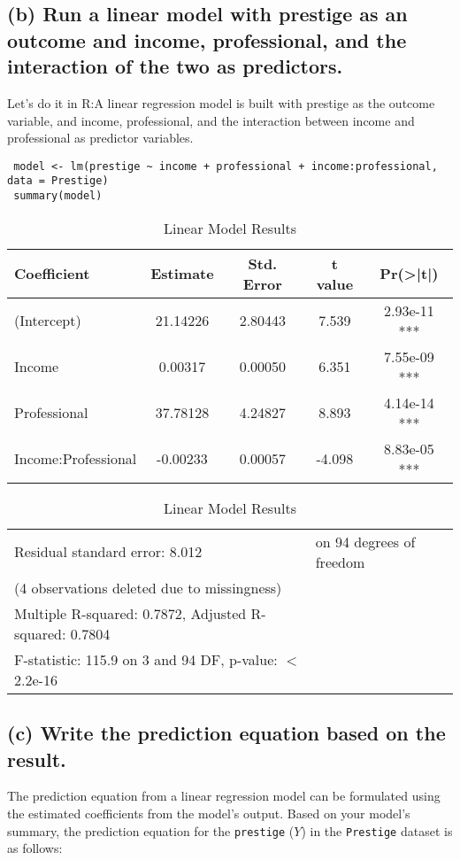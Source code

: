 \documentclass[12pt]{article}
\begin{document}
\subsection{(b) Run a linear model with prestige as an outcome and income, professional, and the
interaction of the two as predictors.}
 Let's do it in R:A linear regression model is built with prestige as the outcome variable, and income, professional, and the interaction between income and professional as predictor variables.
\lstset{style=mystyle}
\begin{lstlisting}
 model <- lm(prestige ~ income + professional + income:professional, data = Prestige)
 summary(model)
\end{lstlisting}
\begin{table}[h]
\centering
\caption{Linear Model Results}
\begin{tabular}{@{}lcccc@{}}
\toprule
Coefficient            & Estimate   & Std. Error & t value & Pr(\textgreater{}|t|) \\ \midrule
(Intercept)            & 21.14226   & 2.80443    & 7.539   & 2.93e-11 ***    \\
Income                 & 0.00317    & 0.00050    & 6.351   & 7.55e-09 ***    \\
Professional           & 37.78128   & 4.24827    & 8.893   & 4.14e-14 ***    \\
Income:Professional    & -0.00233   & 0.00057    & -4.098  & 8.83e-05 ***    \\ \bottomrule
\end{tabular}
\begin{tabular}{@{}ll@{}}
Residual standard error: 8.012 & on 94 degrees of freedom \\
(4 observations deleted due to missingness) & \\
Multiple R-squared:  0.7872,	Adjusted R-squared:  0.7804 & \\
F-statistic: 115.9 on 3 and 94 DF,  p-value: $<$ 2.2e-16 &
\end{tabular}
\label{tab:my_label}
\end{table}




\subsection{ (c) Write the prediction equation based on the result.}

The prediction equation from a linear regression model can be formulated using the estimated coefficients from the model's output. Based on your model's summary, the prediction equation for the \texttt{prestige} (\(Y\)) in the \texttt{Prestige} dataset is as follows:
\end{document}

